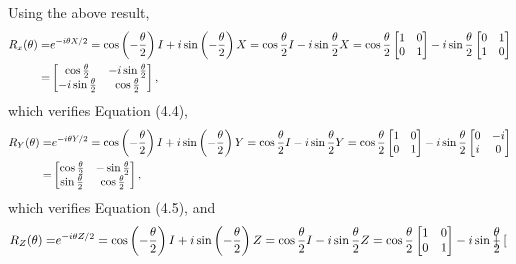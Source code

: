 \documentclass[en]{sol-man}
\begin{document}
\begin{pf}
    Using the above result,
    \begin{align}
        \notag R_x(\theta)=&e^{-i\theta X/2}=\cos\left(-\frac{\theta}{2}\right)I+i\sin\left(-\frac{\theta}{2}\right)X=\cos\frac{\theta}{2}I-i\sin\frac{\theta}{2}X=\cos\frac{\theta}{2}\begin{bmatrix}
            1&0\\
            0&1
        \end{bmatrix}-i\sin\frac{\theta}{2}\begin{bmatrix}
            0&1\\
            1&0
        \end{bmatrix}\\
        =&\begin{bmatrix}
            \cos\frac{\theta}{2}&-i\sin\frac{\theta}{2}\\
            -i\sin\frac{\theta}{2}&\cos\frac{\theta}{2}
        \end{bmatrix},
    \end{align}
    which verifies Equation (4.4),
    \begin{align}
        \notag R_Y(\theta)=&e^{-i\theta Y/2}=\cos\left(-\frac{\theta}{2}\right)I+i\sin\left(-\frac{\theta}{2}\right)Y=\cos\frac{\theta}{2}I-i\sin\frac{\theta}{2}Y=\cos\frac{\theta}{2}\begin{bmatrix}
            1&0\\
            0&1
        \end{bmatrix}-i\sin\frac{\theta}{2}\begin{bmatrix}
            0&-i\\
            i&0
        \end{bmatrix}\\
        =&\begin{bmatrix}
            \cos\frac{\theta}{2}&-\sin\frac{\theta}{2}\\
            \sin\frac{\theta}{2}&\cos\frac{\theta}{2}
        \end{bmatrix},
    \end{align}
    which verifies Equation (4.5), and
    \begin{align}
        \notag R_Z(\theta)=&e^{-i\theta Z/2}=\cos\left(-\frac{\theta}{2}\right)I+i\sin\left(-\frac{\theta}{2}\right)Z=\cos\frac{\theta}{2}I-i\sin\frac{\theta}{2}Z=\cos\frac{\theta}{2}\begin{bmatrix}
            1&0\\
            0&1
        \end{bmatrix}-i\sin\frac{\theta}{2}\begin{bmatrix}

\end{bmatrix}
\end{align}
\end{pf}
\end{document}
